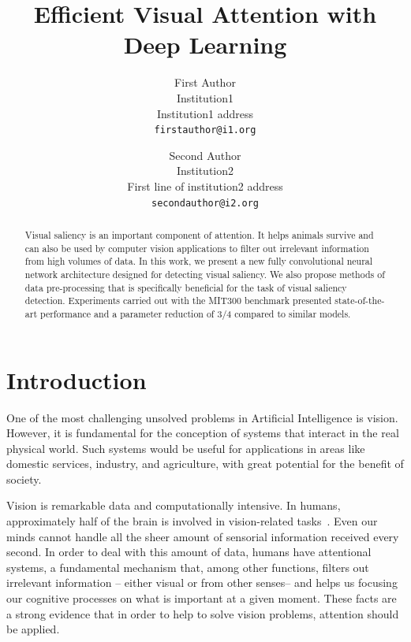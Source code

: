 \documentclass[10pt,twocolumn,letterpaper]{article}
\begin{document}
\title{Efficient Visual Attention with Deep Learning}

\author{First Author\\
Institution1\\
Institution1 address\\
{\tt\small firstauthor@i1.org}
\and
Second Author\\
Institution2\\
First line of institution2 address\\
{\tt\small secondauthor@i2.org}
}

\maketitle

\begin{abstract}
Visual saliency is an important component of attention.
It helps animals survive and can also be used by computer vision applications
to filter out irrelevant information from high volumes of data.
In this work, we present a new fully convolutional neural network
architecture designed for detecting visual saliency.
We also propose methods of data pre-processing that is specifically
beneficial for the task of visual saliency detection.
Experiments carried out with the MIT300 benchmark presented state-of-the-art
performance and a parameter reduction of 3/4 compared to similar models.
\end{abstract}

\section{Introduction}
One of the most challenging unsolved problems in Artificial Intelligence
is vision.
However, it is fundamental for the conception of systems that interact
in the real physical world.
Such systems would be useful for applications in areas like
domestic services, industry, and agriculture,
with great potential for the benefit of society.

Vision is remarkable data and computationally intensive.
In humans, approximately half of the brain is involved in
vision-related tasks~\cite{fixott_1957}.
Even our minds cannot handle all the sheer amount of sensorial information
received every second. In order to deal with this amount of data,
humans have attentional systems, a fundamental mechanism
that, among other functions, filters out irrelevant information
-- either visual or from other senses-- and helps us focusing our cognitive
processes on what is important at a given moment.
These facts are a strong evidence that in order to help to solve
vision problems, attention should be applied.
\end{document}
